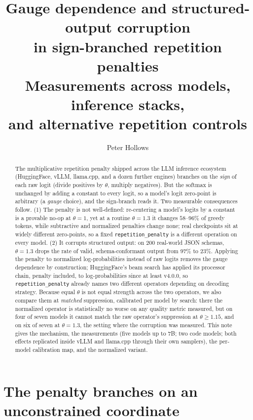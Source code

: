 \documentclass[11pt]{article}
\title{\bf Gauge dependence and structured-output corruption\\ in sign-branched repetition penalties\\
\large Measurements across models, inference stacks,\\ and alternative repetition controls}
\author{Peter Hollows}
\date{}
\newcommand{\thp}{\theta}
\newcommand{\code}[1]{\texttt{#1}}
\begin{document}
\maketitle

\begin{abstract}
The multiplicative repetition penalty shipped across the LLM inference ecosystem (HuggingFace,
vLLM, llama.cpp, and a dozen further engines) branches on
the \emph{sign} of each raw logit (divide positives by $\thp$, multiply negatives). But the
softmax is unchanged by adding a constant to every logit, so a model's logit zero-point is
arbitrary (a \emph{gauge} choice), and the sign-branch reads it. Two
measurable consequences follow. (1) The penalty is not well-defined: re-centering a model's logits by a
constant is a provable no-op at $\thp=1$, yet at a routine $\thp=1.3$ it changes $58$--$96\%$ of
greedy tokens, while subtractive and normalized penalties change none; real checkpoints sit at
widely different zero-points, so a fixed
\code{repetition\_penalty} is a different operation on every model. (2) It corrupts
structured output: on $200$ real-world JSON schemas, $\thp=1.3$ drops the rate of valid,
schema-conformant output from $97\%$ to $23\%$. Applying the penalty to normalized
log-probabilities instead of raw logits removes the gauge dependence by construction;
HuggingFace's beam search has applied its processor chain, penalty included, to log-probabilities
since at least v4.0.0, so \code{repetition\_penalty} already names two different operators depending on
decoding strategy. Because equal $\thp$ is not equal strength across the two operators, we also
compare them at \emph{matched} suppression, calibrated per model by search: there the normalized
operator is statistically no worse on any quality metric measured, but on four of seven models
it cannot match the raw operator's suppression at $\thp\ge1.15$, and on six of seven at
$\thp=1.3$, the setting where the corruption was measured. This note gives the mechanism, the measurements (five models up to 7B; two code
models; both effects replicated inside vLLM and llama.cpp through their own samplers), the
per-model calibration map, and the normalized variant.
\end{abstract}

\section{The penalty branches on an unconstrained coordinate}
\end{document}
